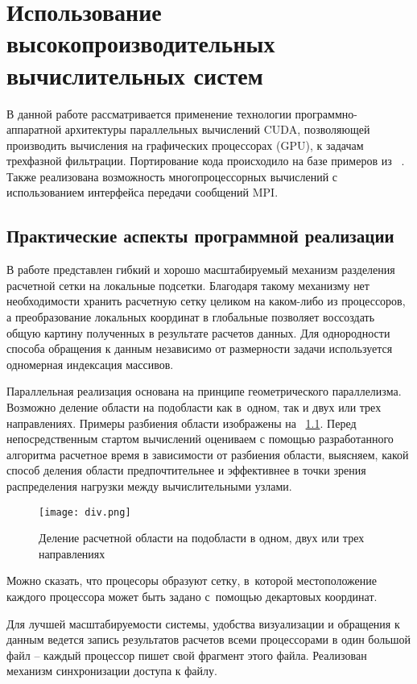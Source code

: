 \chapter{Использование высокопроизводительных вычислительных систем} \label{ch:ch4}

В данной работе рассматривается применение технологии программно-аппаратной архитектуры параллельных вычислений CUDA, позволяющей производить вычисления на графических процессорах (GPU), к задачам трехфазной фильтрации.
Портирование кода происходило на базе примеров из ~\cite{Sanders-CUDA}.
Также реализована возможность многопроцессорных вычислений с использованием
интерфейса передачи сообщений MPI.

\section{Практические аспекты программной реализации} \label{ch:ch4/sect1}

В работе представлен гибкий и хорошо масштабируемый механизм разделения
расчетной сетки на локальные подсетки. Благодаря такому механизму
нет необходимости хранить расчетную сетку целиком на каком-либо из
процессоров, а преобразование локальных координат в глобальные
позволяет воссоздать общую картину полученных в результате расчетов
данных. Для однородности способа обращения к данным независимо
от размерности задачи используется одномерная индексация массивов.

Параллельная реализация основана на принципе геометрического параллелизма.
Возможно деление области на подобласти как в~одном, так и двух или трех направлениях.
Примеры разбиения области изображены на ~\ref{pic_div}.
Перед непосредственным стартом вычислений оцениваем с помощью разработанного алгоритма расчетное время в зависимости от разбиения
области, выясняем, какой способ деления области предпочтительнее и эффективнее в точки зрения распределения нагрузки между вычислительными узлами.

\begin{figure}[!h]\center
\texttt{[image: div.png]} 
\caption{Деление расчетной области на подобласти в одном, двух или трех направлениях}
\label{pic_div}
\end{figure}

Можно сказать, что процесоры образуют сетку, в~которой местоположение каждого процессора может быть задано с~помощью декартовых координат.

Для лучшей масштабируемости системы, удобства визуализации и обращения
к данным ведется запись результатов расчетов всеми процессорами в один большой файл -- каждый процессор
пишет свой фрагмент этого файла. Реализован механизм синхронизации доступа к файлу.

